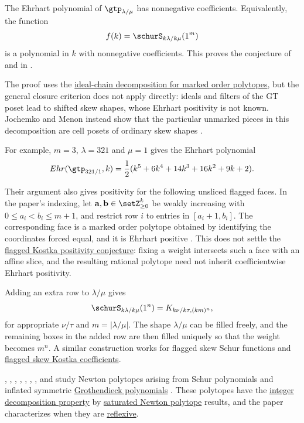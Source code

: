 \begin{theorem}
\label{skewGTEhrhartPositivity}
The Ehrhart polynomial of $\gtp_{\lambda/\mu}$ has nonnegative coefficients.
Equivalently, the function
\[
f(k) = \schurS_{k\lambda/k\mu}(1^m)
\]
is a polynomial in $k$ with nonnegative coefficients.
This proves the conjecture of  and
 in \cite[Conj.~7]{AlexanderssonAlhajjar2018x}.
\end{theorem}
The proof uses the
\hyperref[markedOrderPolytopePositivity]{ideal-chain decomposition for marked
order polytopes}, but the general closure criterion does not apply directly:
ideals and filters of the GT poset lead to shifted skew shapes, whose Ehrhart
positivity is not known.  Jochemko and Menon instead show that the particular
unmarked pieces in this decomposition are cell posets of ordinary skew shapes
\cite[Sec.~1 and proof of Thm.~3.5]{JochemkoMenon2026x}.

For example, $m=3$, $\lambda=321$ and $\mu=1$ gives the Ehrhart polynomial
\[
Ehr(\gtp_{321/1},k) = \frac{1}{2} (k^5+6 k^4+14 k^3+16 k^2+9 k+2).
\]

Their argument also gives positivity for the following unsliced flagged
faces.  In the paper's indexing, let
$\mathbf a,\mathbf b\in\setZ_{\geq0}^k$ be weakly increasing with
$0\leq a_i<b_i\leq m+1$, and restrict row $i$ to entries in
$[a_i+1,b_i]$.  The corresponding face is a marked order polytope obtained
by identifying the coordinates forced equal, and it is Ehrhart positive
\cite[Sec.~3.2]{JochemkoMenon2026x}.  This does not settle the
\hyperref[flaggedSchurKostka]{flagged Kostka positivity conjecture}: fixing a
weight intersects such a face with an affine slice, and the resulting
rational polytope need not inherit coefficientwise Ehrhart positivity.

Adding an extra row to $\lambda/\mu$ gives
\[
\schurS_{k\lambda/k\mu}(1^n) = K_{k\nu/k\tau,(km)^n},
\]
for appropriate $\nu/\tau$ and $m = |\lambda/\mu|$.
The shape $\lambda/\mu$ can be filled freely, and the remaining boxes in the
added row are then filled uniquely so that the weight becomes $m^n$.
A similar construction works for flagged skew Schur
functions and \hyperref[schurFlagged]{flagged skew Kostka coefficients}.

, , ,
, , ,
, and  study Newton polytopes arising
from Schur polynomials and inflated symmetric
\hyperref[grothendieck]{Grothendieck polynomials}
\cite{BayerGoecknerHongMcAllisterOlsenPinckneyVegaYip2021}.  These polytopes
have the \hyperref[polytopeIDP]{integer decomposition property} by
\hyperref[newtonPolytopes]{saturated Newton polytope} results, and the paper
characterizes when they are \hyperref[reflexivePolytope]{reflexive}.



